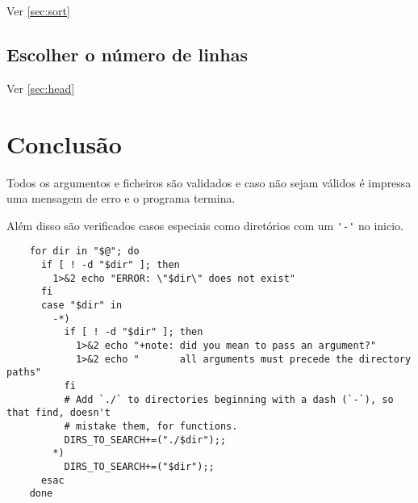 Ver \ref{sec:sort}

\subsection{Escolher o número de linhas}

Ver \ref{sec:head}


\section{Conclusão}

Todos os argumentos e ficheiros são validados e caso não sejam válidos é impressa uma mensagem de erro e o programa termina.

Além disso são verificados casos especiais como diretórios com um \Verb|'-'| no inicio.

\begin{listing}[H]
  \begin{verbatim}
    for dir in "$@"; do
      if [ ! -d "$dir" ]; then
        1>&2 echo "ERROR: \"$dir\" does not exist"
      fi
      case "$dir" in
        -*)
          if [ ! -d "$dir" ]; then
            1>&2 echo "+note: did you mean to pass an argument?"
            1>&2 echo "       all arguments must precede the directory paths"
          fi
          # Add `./` to directories beginning with a dash (`-`), so that find, doesn't
          # mistake them, for functions.
          DIRS_TO_SEARCH+=("./$dir");;
        *)
          DIRS_TO_SEARCH+=("$dir");;
      esac
    done
  \end{verbatim}
\end{listing}
